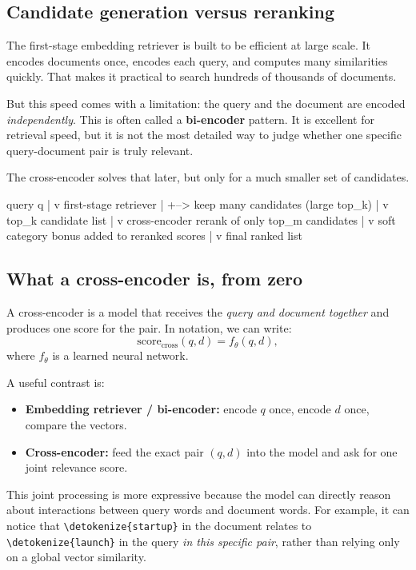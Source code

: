\documentclass[10pt]{article}
\DeclareRobustCommand{\code}[1]{%
  \ifmmode
    \text{\nolinkurl{\detokenize{#1}}}%
  \else
    \nolinkurl{\detokenize{#1}}%
  \fi
}
\begin{document}
\subsection{Candidate generation versus reranking}

The first-stage embedding retriever is built to be efficient at large scale. It encodes documents once, encodes each query, and computes many similarities quickly. That makes it practical to search hundreds of thousands of documents.

But this speed comes with a limitation: the query and the document are encoded \emph{independently}. This is often called a \textbf{bi-encoder} pattern. It is excellent for retrieval speed, but it is not the most detailed way to judge whether one specific query-document pair is truly relevant.

The cross-encoder solves that later, but only for a much smaller set of candidates.

\begin{asciibox}[title={Two-stage retrieval in one query}]
query q
  |
  v
first-stage retriever
  |
  +--> keep many candidates (large top_k)
  |
  v
top_k candidate list
  |
  v
cross-encoder rerank of only top_m candidates
  |
  v
soft category bonus added to reranked scores
  |
  v
final ranked list
\end{asciibox}

\subsection{What a cross-encoder is, from zero}

A cross-encoder is a model that receives the \emph{query and document together} and produces one score for the pair. In notation, we can write:
\[
\mathrm{score}_{\text{cross}}(q,d)=f_\theta(q,d),
\]
where \(f_\theta\) is a learned neural network.

A useful contrast is:
\begin{itemize}
    \item \textbf{Embedding retriever / bi-encoder:} encode \(q\) once, encode \(d\) once, compare the vectors.
    \item \textbf{Cross-encoder:} feed the exact pair \((q,d)\) into the model and ask for one joint relevance score.
\end{itemize}

This joint processing is more expressive because the model can directly reason about interactions between query words and document words. For example, it can notice that \code{startup} in the document relates to \code{launch} in the query \emph{in this specific pair}, rather than relying only on a global vector similarity.
\end{document}
